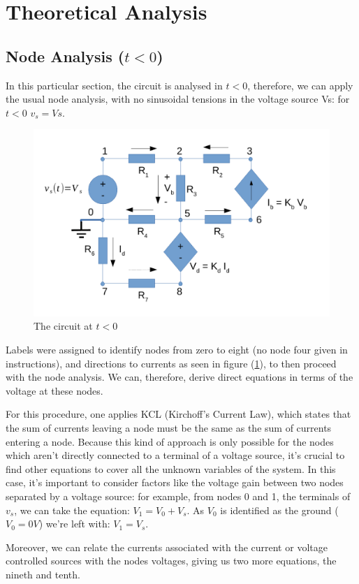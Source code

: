 \section{Theoretical Analysis}
\label{sec:analysis}



\subsection{Node Analysis ($t<0$)}

In this particular section, the circuit is analysed in $t<0$, therefore, we can apply the usual node analysis, with no sinusoidal tensions in the voltage source Vs: for $t<0$ $v_s = Vs$.

\begin{figure}[h] \centering
\includegraphics[width=0.5\linewidth]{t2-t1.pdf}
\caption{The circuit at $t<0$}
\label{fig2}
\end{figure}

Labels were assigned to identify nodes from zero to eight (no node four given in instructions), and directions to currents as seen in figure (\ref{fig2}), to then proceed with the node analysis.  We can, therefore, derive direct equations in terms of the voltage at these nodes.

For this procedure, one applies KCL (Kirchoff's Current Law), which states that the sum of currents leaving a node must be the same as the sum of currents entering a node. Because this kind of approach is only possible for the nodes which aren't directly connected to a terminal of a voltage source, it's crucial to find other equations to cover all the unknown variables of the system. In this case, it's important to consider factors like the voltage gain between two nodes separated by a voltage source: for example, from nodes 0 and 1, the terminals of $v_s$, we can take the equation: $V_1 = V_0 + V_s$. As $V_0$ is identified as the ground ($V_0 = 0V$) we're left with: $V_1 = V_s$.

Moreover, we can relate the currents associated with the current or voltage controlled sources with the nodes voltages, giving us two more equations, the nineth and tenth.

